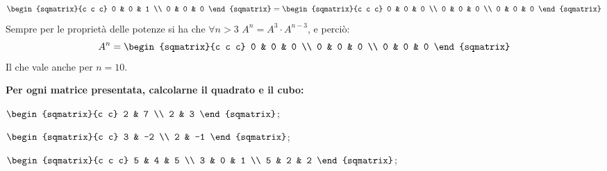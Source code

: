 \begin{esempio}
\[\begin{sqmatrix}{c c c}
            0 & 0 & 1 \\
            0 & 0 & 0
        \end{sqmatrix}
        =
        \begin{sqmatrix}{c c c}
            0 & 0 & 0 \\
            0 & 0 & 0 \\
            0 & 0 & 0
        \end{sqmatrix}
    \]
    Sempre per le proprietà delle potenze si ha che $\forall n > 3$ $A^n = A^3 \cdot A^{n - 3}$, e perciò:
    \[
        A^n =
        \begin{sqmatrix}{c c c}
            0 & 0 & 0 \\
            0 & 0 & 0 \\
            0 & 0 & 0
        \end{sqmatrix}
    \]
    Il che vale anche per $n = 10$.
\end{esempio}
\begin{exer}
    \textbf{Per ogni matrice presentata, calcolarne il quadrato e il cubo:}

    $
        \begin{sqmatrix}{c c}
            2 & 7 \\
            2 & 3
        \end{sqmatrix}
    $;

    $
        \begin{sqmatrix}{c c}
            3 & -2 \\
            2 & -1
        \end{sqmatrix}
    $;

    $
        \begin{sqmatrix}{c c c}
            5 & 4 & 5 \\
            3 & 0 & 1 \\
            5 & 2 & 2
        \end{sqmatrix}
    $;
\end{exer}

